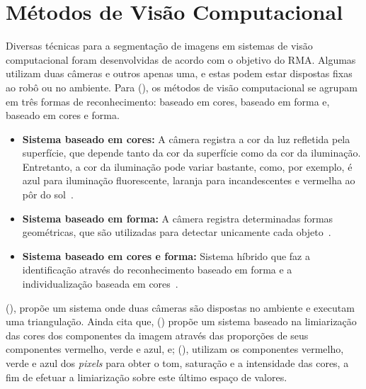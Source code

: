 \section{Métodos de Visão Computacional}
\label{sec:metodos-visaoComputacional}

Diversas técnicas para a segmentação de imagens em sistemas de visão computacional foram desenvolvidas de acordo com o objetivo do RMA. Algumas utilizam duas câmeras e outros apenas uma, e estas podem estar dispostas fixas ao robô ou no ambiente. Para \citeauthor{araujo2008reconhecimento} (\citeyear{araujo2008reconhecimento}), os métodos de visão computacional se agrupam em três formas de reconhecimento: baseado em cores, baseado em forma e, baseado em cores e forma.

\begin{itemize}
    \item \textbf{Sistema baseado em cores:} A câmera registra a cor da luz refletida pela superfície, que depende tanto da cor da superfície como da cor da iluminação. Entretanto, a cor da iluminação pode variar bastante, como, por exemplo, é azul para iluminação fluorescente, laranja para incandescentes e vermelha ao pôr do sol~\cite{konzen2007problema}.
    
    \item \textbf{Sistema baseado em forma:} A câmera registra determinadas formas geométricas, que são utilizadas para detectar unicamente cada objeto~\cite{garcia2007arcaboucco}.
    
    \item \textbf{Sistema baseado em cores e forma:} Sistema híbrido que faz a identificação através do reconhecimento baseado em forma e a individualização baseada em cores~\cite{martins2007towards}.
\end{itemize}


\citeauthor{andrade2006sistema} (\citeyear{andrade2006sistema}), propõe um sistema onde duas câmeras são dispostas no ambiente e executam uma triangulação. Ainda cita que, \citeauthor{souza2003desenvolvimento} (\citeyear{souza2003desenvolvimento}) propõe um sistema baseado na limiarização das cores dos componentes da imagem através das proporções de seus componentes vermelho, verde e azul, e; \citeauthor{penharbel2004filtro} (\citeyear{penharbel2004filtro}), utilizam os componentes vermelho, verde e azul dos \textit{pixels} para obter o tom, saturação e a intensidade das cores, a fim de efetuar a limiarização sobre este último espaço de valores.

